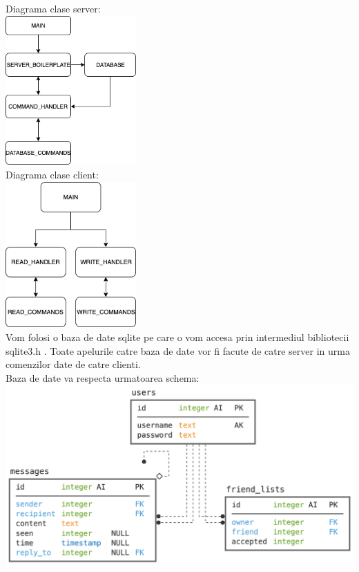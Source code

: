 \documentclass[runningheads]{llncs}
\begin{document}
Diagrama clase server:\\
\includegraphics[width=50mm,scale=1]{retele_pics/server_classes.png}\\
Diagrama clase client:\\
\includegraphics[width=50mm,scale=1]{retele_pics/client_classes.png}\\
Vom folosi o baza de date sqlite pe care o vom accesa prin intermediul bibliotecii sqlite3.h . Toate apelurile catre baza de date vor fi facute de catre server in urma comenzilor date de catre clienti.\\
Baza de date va respecta urmatoarea schema:\\
\includegraphics[width=150mm,scale=1]{retele_pics/database_schemas/database_schema.png}\\
\end{document}
